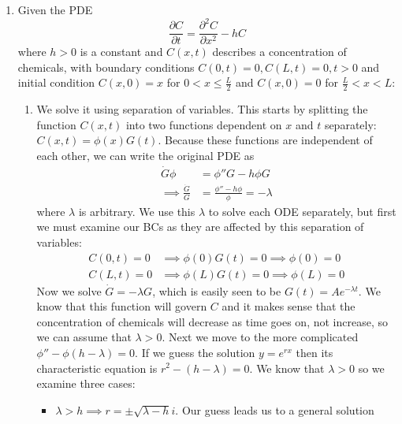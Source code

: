 \documentclass[12pt]{article}
\numberwithin{equation}{section}
\numberwithin{figure}{section}
\begin{document}
\begin{enumerate}
        \item Given the PDE 
        \begin{equation*}
            \frac{\partial C}{\partial t}=\frac{\partial^2 C}{\partial x^2}-hC
        \end{equation*}
        where $h>0$ is a constant and $C(x,t)$ describes a concentration of chemicals, with boundary conditions 
        $C(0,t)=0, C(L,t)=0, t>0$ and initial condition $C(x,0)=x$ for $0<x\leq \frac{L}{2}$ and $C(x,0)=0$ for 
        $\frac{L}{2}<x<L$:
        \begin{enumerate}
            \item We solve it using separation of variables. This starts by splitting the function $C(x,t)$ into 
            two functions dependent on $x$ and $t$ separately: $C(x,t)=\phi(x)G(t)$. Because these functions are 
            independent of each other, we can write the original PDE as
            \begin{align*}
                \dot{G}\phi&=\phi'' G-h\phi G\\
                \implies \frac{\dot{G}}{G}&=\frac{\phi''-h\phi}{\phi}=-\lambda
            \end{align*}
            where $\lambda$ is arbitrary. We use this $\lambda$ to solve each ODE separately, but first we must 
            examine our BCs as they are affected by this separation of variables:
            \begin{align*}
                C(0,t)=0&\implies \phi(0)G(t)=0\implies\phi(0)=0\\
                C(L,t)=0&\implies \phi(L)G(t)=0\implies\phi(L)=0
            \end{align*}
            Now we solve $\dot{G}=-\lambda G$, which is easily seen to be $G(t)=Ae^{-\lambda t}$. We know that 
            this function will govern $C$ and it makes sense that the concentration of chemicals will decrease as 
            time goes on, not increase, so we can assume that $\lambda>0$.\newline
            Next we move to the more complicated $\phi'' -\phi(h-\lambda)=0$. If we guess the solution $y=e^{rx}$ 
            then its characteristic equation is $r^2-(h-\lambda)=0$. We know that $\lambda>0$ so we examine 
            three cases: 
            \begin{itemize}
                \item $\lambda>h \implies r=\pm \sqrt{\lambda-h}i$. Our guess leads us to a general solution
                \begin{align*}

\end{align*}
\end{itemize}
\end{enumerate}
\end{enumerate}
\end{document}
